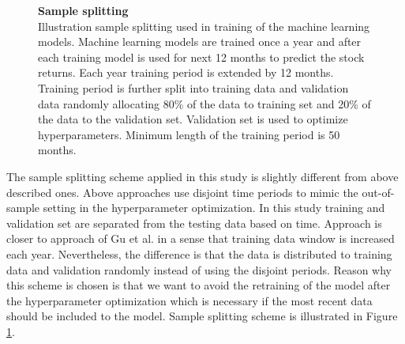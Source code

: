 \documentclass{article}
\begin{document}
\begin{figure}[ht]
\centering
\caption[Sample splitting scheme]{\textbf{Sample splitting}\\ Illustration sample splitting used in training of the machine learning models. Machine learning models are trained once a year and after each training model is used for next 12 months to predict the stock returns. Each year training period is extended by 12 months. Training period is further split into training data and validation data randomly allocating 80\% of the data to training set and 20\% of the data to the validation set. Validation set is used to optimize hyperparameters. Minimum length of the training period is 50 months.}
\label{plot:SampleSplitting}
\end{figure}

The sample splitting scheme applied in this study is slightly different from above described ones. Above approaches use disjoint time periods to mimic the out-of-sample setting in the hyperparameter optimization. In this study training and validation set are separated from the testing data based on time. Approach is closer to approach of Gu et al. \citeyear{guetal} in a sense that training data window is increased each year. Nevertheless, the difference is that the data is distributed to training data and validation randomly instead of using the disjoint periods. Reason why this scheme is chosen is that we want to avoid the retraining of the model after the hyperparameter optimization which is necessary if the most recent data should be included to the model. Sample splitting scheme is illustrated in Figure \ref{plot:SampleSplitting}. \par
\end{document}
